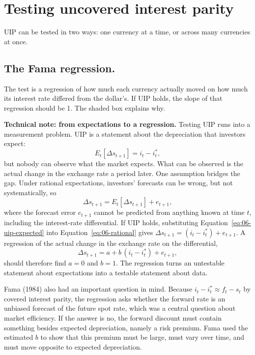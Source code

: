 \section{Testing uncovered interest parity}
\label{sec:06-how}

UIP can be tested in two ways: one currency at a time, or across many currencies at once.


\subsection{The Fama regression.} 

The test is a regression of how much each currency actually moved on how much its interest rate differed from the dollar's. If UIP holds, the slope of that regression should be 1. The shaded box explains why.

\begin{technote}
\textbf{Technical note: from expectations to a regression.} Testing UIP runs into a measurement problem. UIP is a statement about the depreciation that investors expect:
\begin{equation}
  E_t[\Delta s_{t+1}] = i_t - i^*_t,
  \label{eq:06-uip-expected}
\end{equation}
but nobody can observe what the market expects. What can be observed is the actual change in the exchange rate a period later. One assumption bridges the gap. Under rational expectations, investors' forecasts can be wrong, but not systematically, so
\begin{equation}
  \Delta s_{t+1} = E_t[\Delta s_{t+1}] + e_{t+1},
  \label{eq:06-rational}
\end{equation}
where the forecast error $e_{t+1}$ cannot be predicted from anything known at time $t$, including the interest-rate differential. If UIP holds, substituting Equation~\eqref{eq:06-uip-expected} into Equation~\eqref{eq:06-rational} gives $\Delta s_{t+1} = (i_t - i^*_t) + e_{t+1}$. A regression of the actual change in the exchange rate on the differential,
\begin{equation}
  \Delta s_{t+1} = a + b\,(i_t - i^*_t) + e_{t+1},
  \label{eq:06-fama}
\end{equation}
should therefore find $a = 0$ and $b = 1$. The regression turns an untestable statement about expectations into a testable statement about data.
\end{technote}

Fama (1984) also had an important question in mind. Because $i_t - i^*_t \approx f_t - s_t$ by covered interest parity, the regression asks whether the forward rate is an unbiased forecast of the future spot rate, which was a central question about market efficiency. If the answer is no, the forward discount must contain something besides expected depreciation, namely a risk premium. Fama used the estimated $b$ to show that this premium must be large, must vary over time, and must move opposite to expected depreciation.

